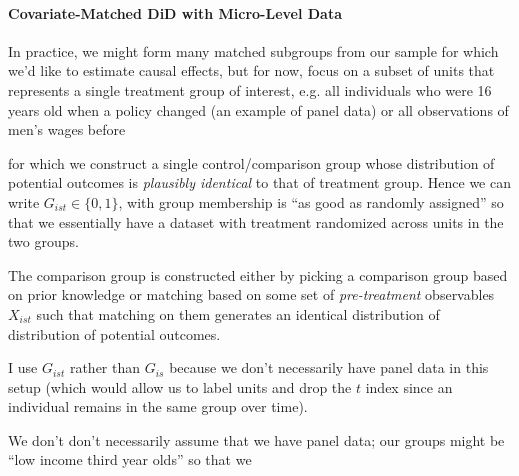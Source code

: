 \documentclass[12pt]{article}
\theoremstyle{plain}
\theoremstyle{definition}
\theoremstyle{remark}
\begin{document}
\paragraph{
  Covariate-Matched DiD with Micro-Level Data
}
In practice, we might form many matched subgroups from our sample for
which we'd like to estimate causal effects,
but for now, focus on a subset of units that represents a single
treatment group of interest, e.g. all individuals who were 16 years old
when a policy changed (an example of panel data) or all observations
of men's wages before

for which we construct a
single control/comparison group whose distribution of potential outcomes
is \emph{plausibly identical} to that of treatment group.
Hence we can write $G_{ist}\in\{0,1\}$,
with group membership is ``as good as randomly assigned''
so that we essentially have a dataset with treatment randomized across
units in the two groups.

The comparison group is constructed either by picking a comparison
group based on prior knowledge or matching based on some set of
\emph{pre-treatment} observables $X_{ist}$ such that matching on them
generates an identical distribution of distribution of potential
outcomes.

I use $G_{ist}$ rather than $G_{is}$ because we don't necessarily have
panel data in this setup (which would allow us to label units and drop
the $t$ index since an individual remains in the same group over time).

We don't don't necessarily assume that we have panel data;
our groups might be ``low income third year olds'' so that we
\end{document}
